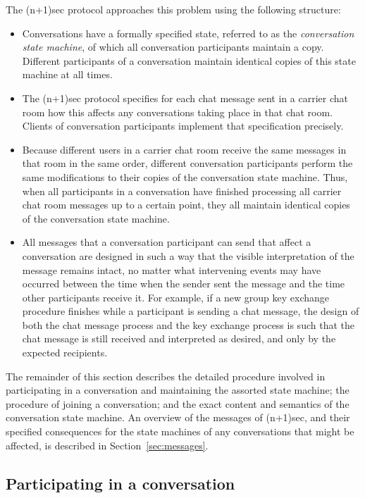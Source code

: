 \documentclass{article}
\begin{document}
The (n+1)sec protocol approaches this problem using the following structure:
\begin{itemize}
\item Conversations have a formally specified state, referred to as the \emph{conversation state machine}, of which all conversation participants maintain a copy. Different participants of a conversation maintain identical copies of this state machine at all times.
\item The (n+1)sec protocol specifies for each chat message sent in a carrier chat room how this affects any conversations taking place in that chat room. Clients of conversation participants implement that specification precisely.
\item Because different users in a carrier chat room receive the same messages in that room in the same order, different conversation participants perform the same modifications to their copies of the conversation state machine. Thus, when all participants in a conversation have finished processing all carrier chat room messages up to a certain point, they all maintain identical copies of the conversation state machine.
\item All messages that a conversation participant can send that affect a conversation are designed in such a way that the visible interpretation of the message remains intact, no matter what intervening events may have occurred between the time when the sender sent the message and the time other participants receive it. For example, if a new group key exchange procedure finishes while a participant is sending a chat message, the design of both the chat message process and the key exchange process is such that the chat message is still received and interpreted as desired, and only by the expected recipients.
\end{itemize}

The remainder of this section describes the detailed procedure involved in participating in a conversation and maintaining the assorted state machine; the procedure of joining a conversation; and the exact content and semantics of the conversation state machine.
An overview of the messages of (n+1)sec, and their specified consequences for the state machines of any conversations that might be affected, is described in Section~\ref{sec:messages}.


\subsection{Participating in a conversation}
\label{sec:conversation-state-machine/participating}
\end{document}
